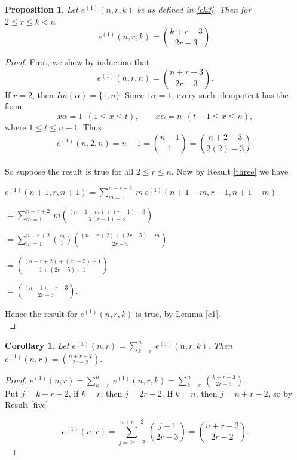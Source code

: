 \documentclass[10pt]{extarticle}
\numberwithin{equation}{section}
\numberwithin{bbb}{section}
\newtheorem{proposition}{Proposition}[section]
\newtheorem{corollary}{Corollary}[section]
\numberwithin{equation}{section}
\begin{document}
\vspace{0.5cm}
\begin{proposition}
  Let $e^{(1)}(n,r,k)$ be as defined in \eqref{ck3}. Then for \ $2 \leq r \leq k < n$ 
    $$e^{(1)}(n,r,k)=\binom{k+r-3}{2r-3}.$$
\end{proposition}
\begin{proof}
    First, we show by induction that
    $$e^{(1)}(n,r,n)=\binom{n+r-3}{2r-3}.$$
    If $r=2$, then $Im(\alpha)=\{1,n\}$. Since $1\alpha=1$, every such idempotent has the form
    $$x\alpha=1 \ \ (1 \leq x \leq t),  \ \ \ \ \ \ \ \ \ x\alpha=n \ \ (t+1 \leq x \leq n),$$
    where $1 \leq t \leq n-1$.
    Thus
    $$e^{(1)}(n,2,n)=n-1=\binom{n-1}{1}=\binom{n+2-3}{2(2)-3}.$$\\[10pt]
   So suppose the result is true for all $2 \leq r \leq n$. Now by Result \ref{three} we have
    
    \vspace{0.5cm}
    $e^{(1)}(n+1,r,n+1)=\sum_{m=1}^{n-r+2} \ m \ e^{(1)}(n+1-m,r-1,n+1-m)$
    
  \vspace{0.5cm}
  \hspace{3.2cm}
  $=\sum_{m=1}^{n-r+2} \ m \binom{(n+1-m)+(r-1)-3}{2(r-1)-3}$
  
   \vspace{0.5cm}
  \hspace{3.2cm}
  $=\sum_{m=1}^{n-r+2} \binom{m}{1}\binom{(n-r+2)+(2r-5)-m}{2r-5}$
  
  \vspace{0.5cm}
  \hspace{3.2cm}
  $=\binom{(n-r+2)+(2r-5)+1}{1+(2r-5)+1}$
  
    \vspace{0.5cm}
  \hspace{3.2cm}
  $=\binom{(n+1)+r-3}{2r-3}.$

  \vspace{0.5cm}
  Hence the result for $e^{(1)}(n,r,k)$ is true, by Lemma \ref{e1}.\\
\end{proof}

\vspace{0.5cm}
\begin{corollary}
  Let $e^{(1)}(n,r)=\sum_{k=r}^{n} \ e^{(1)}(n,r,k).$ Then $e^{(1)}(n,r)=\binom{n+r-2}{2r-2}.$
\end{corollary}
\begin{proof}
$e^{(1)}(n,r)=\sum_{k=r}^{n} \ e^{(1)}(n,r,k)=\sum_{k=r}^{n} \ \binom{k+r-3}{2r-3}.$\\[10pt]
Put $j=k+r-2$, if $k=r$, then $j=2r-2$. If $k=n$, then $j=n+r-2$, so by Result \ref{five}

$$e^{(1)}(n,r)=\sum_{j=2r-2}^{n+r-2} \ \binom{j-1}{2r-3}=\binom{n+r-2}{2r-2}.$$
\end{proof}
\end{document}
